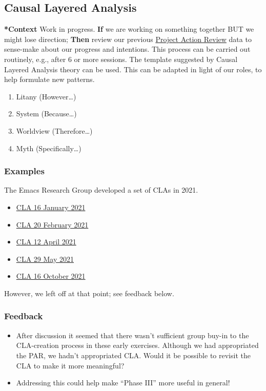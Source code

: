 \documentclass{article}
\begin{document}
\subsection{Causal Layered Analysis}
\label{56ce8d31-d3d6-4493-bb41-b07d810afbcc}
\textbf{*Context} Work in progress. \textbf{If} we are working on something together BUT
we might lose direction; \textbf{Then} review our previous \hyperref[f5a1bc15-5abb-44d6-8f7a-e254974c9002]{Project Action
Review} data to sense-make about our progress and intentions.  This
process can be carried out routinely, e.g., after 6 or more sessions.
The template suggested by Causal Layered Analysis theory can be used.
This can be adapted in light of our roles, to help formulate new
patterns.

\begin{enumerate}
\item Litany (However\ldots{})
\item System (Because\ldots{})
\item Worldview (Therefore\ldots{})
\item Myth (Specifically\ldots{})
\end{enumerate}

\subsubsection{Examples}

The Emacs Research Group developed a set of CLAs in 2021.

\begin{itemize}
\item \href{../../git-repos/exp2exp.github.io/src/cla-16-january-2021.org}{CLA 16 January 2021}
\item \href{../../git-repos/exp2exp.github.io/src/cla-20-february-2021.org}{CLA 20 February 2021}
\item \href{../../git-repos/exp2exp.github.io/src/cla-12-april-2021.org}{CLA 12 April 2021}
\item \href{../../git-repos/exp2exp.github.io/src/cla-29-may-2021.org}{CLA 29 May 2021}
\item \href{../../git-repos/exp2exp.github.io/src/cla-16-october-2021.org}{CLA 16 October 2021}
\end{itemize}

However, we left off at that point; see feedback below.

\subsubsection{Feedback}

\begin{itemize}
\item After discussion it seemed that there wasn't sufficient group buy-in to the CLA-creation process in these early exercises.  Although we had appropriated the PAR, we hadn't appropriated CLA.  Would it be possible to revisit the CLA to make it more meaningful?
\item Addressing this could help make “Phase III” more useful in general!
\end{itemize}
\end{document}

